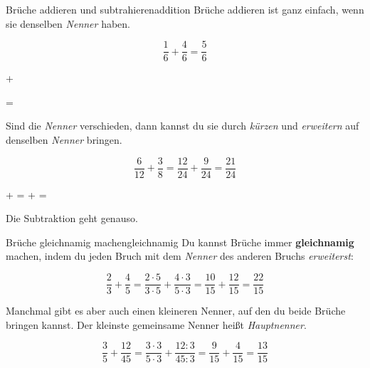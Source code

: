 \documentclass[lerntheke,12pt,a5paper,landscape]{arbeitsblatt}
\begin{document}
	\begin{hilfekarte}{Brüche addieren und subtrahieren}{addition}
		Brüche addieren ist ganz einfach, wenn sie denselben \emph{Nenner} haben.
		\begin{multicols}{2}
			\[ \frac{1}{6} + \frac{4}{6} = \frac{5}{6} \]

			\begin{center}
				 +  = 
			\end{center}
		\end{multicols}
		\vspace{1cm}

		Sind die \emph{Nenner} verschieden, dann kannst du sie durch \emph{kürzen} und \emph{erweitern} auf denselben \emph{Nenner} bringen.

		\[ \frac{6}{12} + \frac{3}{8} = \frac{12}{24} + \frac{9}{24} = \frac{21}{24} \]

		\begin{center}
			  +
			 =
			 +
			 =
		\end{center}

		Die Subtraktion geht genauso.
	\end{hilfekarte}

	\begin{hilfekarte}{Brüche gleichnamig machen}{gleichnamig}
		Du kannst Brüche immer \textbf{gleichnamig} machen, indem du jeden Bruch mit dem \emph{Nenner} des anderen Bruchs \emph{erweiterst}:

		\[ \frac{2}{3} + \frac{4}{5} = \frac{2\cdot 5}{3\cdot 5} + \frac{4\cdot 3}{5\cdot 3} = \frac{10}{15} + \frac{12}{15} = \frac{22}{15} \]

		\vspace{2cm}
		Manchmal gibt es aber auch einen kleineren Nenner, auf den du beide Brüche bringen kannst. Der kleinste gemeinsame Nenner heißt \emph{Hauptnenner}.

		\[ \frac{3}{5} + \frac{12}{45} = \frac{3\cdot 3}{5\cdot 3} + \frac{12 : 3}{45 : 3} = \frac{9}{15} + \frac{4}{15} = \frac{13}{15} \]
	\end{hilfekarte}
\end{document}
